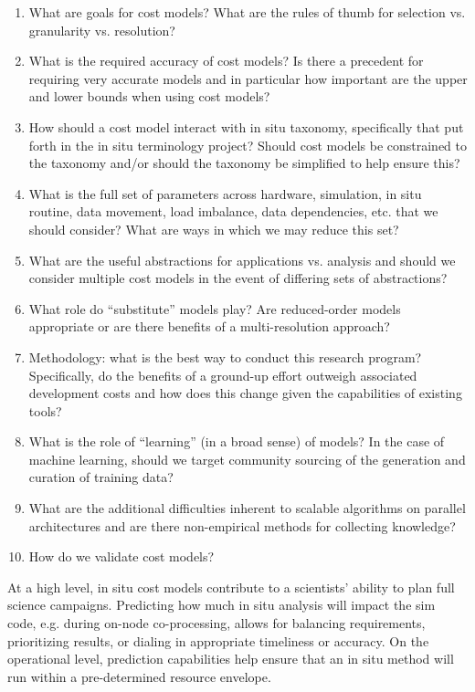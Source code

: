 \begin{refsection}
\begin{enumerate}
    \item What are goals for cost models? What are the rules of thumb for selection vs. granularity vs. resolution?
    \item What is the required accuracy of cost models?  Is there a precedent for requiring very accurate models and in particular how important are the upper and lower bounds when using cost models?
    \item How should a cost model interact with in situ taxonomy, specifically that put forth in the in situ terminology project?  Should cost models be constrained to the taxonomy and/or should the taxonomy be simplified to help ensure this?
    \item What is the full set of parameters across hardware, simulation, in situ routine, data movement, load imbalance, data dependencies, etc. that we should consider?  What are ways in which we may reduce this set?
    \item What are the useful abstractions for applications vs. analysis and should we consider multiple cost models in the event of differing sets of abstractions?
    \item What role do “substitute” models play?  Are reduced-order models appropriate or are there benefits of a multi-resolution approach?
    \item Methodology: what is the best way to conduct this research program?  Specifically, do the benefits of a ground-up effort outweigh associated development costs and how does this change given the capabilities of existing tools?
    \item What is the role of “learning” (in a broad sense) of models?  In the case of machine learning, should we target community sourcing of the generation and curation of training data?
    \item What are the additional difficulties inherent to scalable algorithms on parallel architectures and are there non-empirical methods for collecting knowledge?
    \item How do we validate cost models?
\end{enumerate}

\noindent
At a high level, in situ cost models contribute to a scientists’ ability to plan full science campaigns.  
Predicting how much in situ analysis will impact the sim code, e.g. during on-node co-processing, allows for balancing requirements, prioritizing results, or dialing in appropriate timeliness or accuracy.  
On the operational level, prediction capabilities help ensure that an in situ method will run within a pre-determined resource envelope.

\printbibliography
\end{refsection}


